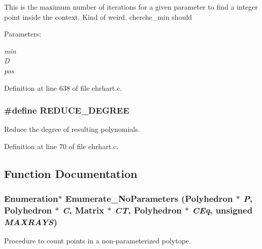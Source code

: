 This is the maximum number of iterations for a given parameter to find a integer point inside the context. Kind of weird. cherche\_\-min should



\begin{Desc}
\item[Parameters: ]\par
\begin{description}
\item[{\em 
min}]\item[{\em 
D}]\item[{\em 
pos}]\end{description}
\end{Desc}


Definition at line 638 of file ehrhart.c.
\subsubsection{\setlength{\rightskip}{0pt plus 5cm}\#define REDUCE\_\-DEGREE}\label{ehrhart_8c_a1}


Reduce the degree of resulting polynomials.



Definition at line 70 of file ehrhart.c.

\subsection{Function Documentation}
\subsubsection{\setlength{\rightskip}{0pt plus 5cm}Enumeration$\ast$ Enumerate\_\-No\-Parameters (Polyhedron $\ast$ {\em P}, Polyhedron $\ast$ {\em C}, Matrix $\ast$ {\em CT}, Polyhedron $\ast$ {\em CEq}, unsigned {\em MAXRAYS})}\label{ehrhart_8c_a26}


Procedure to count points in a non-parameterized polytope.

